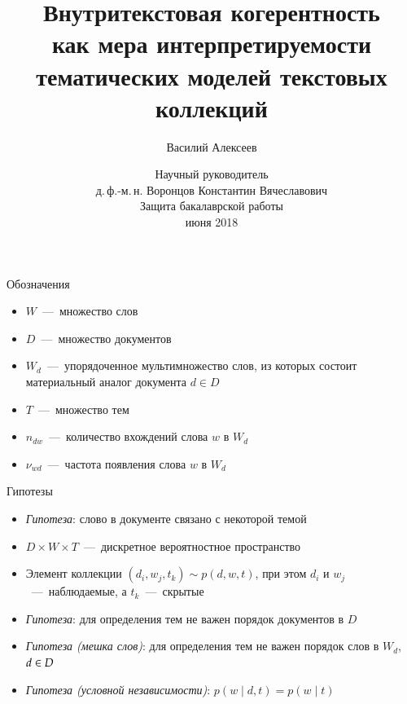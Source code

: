 \documentclass[sans, mathsans, russian]{beamer}
\title[Внутритекстовая когерентность]
{
  Внутритекстовая когерентность\\
  как мера интерпретируемости\\
  тематических моделей текстовых коллекций\\
}
\subtitle{}
\author[Василий Алексеев]{
  Василий Алексеев
}
\institute[]
{
  \footnotesize
}
\date[IS 2018]
{
  \footnotesize
  {
    Научный руководитель\\
    д.\,ф.-м.\,н. Воронцов Константин Вячеславович\\ \bigskip
    Защита бакалаврской работы\\ \bigskip
    27 июня 2018
  }
}
\begin{document}

		

  
\frame{\titlepage}


\begin{frame}{Обозначения}
  \begin{itemize}
    \item $W$~---~множество слов
    \item $D$~---~множество документов
    \item $W_d$~---~упорядоченное мультимножество слов, из которых состоит материальный аналог документа $d \in D$
    \item $T$~---~множество тем
    \item $n_{dw}$~---~количество вхождений слова $w$ в $W_d$
    \item $\nu_{wd}$~---~частота появления слова $w$ в $W_d$
  \end{itemize}
\end{frame}


\begin{frame}{Гипотезы}
  \begin{itemize}
    \item \emph{Гипотеза}: слово в документе связано с некоторой темой
    \item $D\times W\times T$~---~дискретное вероятностное пространство
    \item Элемент коллекции $(d_i, w_j, t_k) \sim p(d, w, t)$, при этом $d_i$ и $w_j$~---~наблюдаемые, а $t_k$~---~скрытые
    \item \emph{Гипотеза}: для определения тем не важен порядок документов в $D$
    \item \emph{Гипотеза (мешка слов)}: для определения тем не важен порядок слов в $W_d$, $d \hm\in D$
    \item \emph{Гипотеза (условной независимости)}: $p(w \mid d, t) = p(w \mid t)$
  \end{itemize}
\end{frame}
\end{document}
